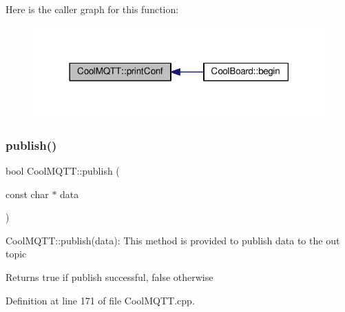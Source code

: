 Here is the caller graph for this function\+:
\nopagebreak
\begin{figure}[H]
\begin{center}
\leavevmode
\includegraphics[width=318pt]{class_cool_m_q_t_t_a40553a0ad4b5ecf1cb4411ab54ca85fb_icgraph}
\end{center}
\end{figure}
\mbox{\label{class_cool_m_q_t_t_ace977b3e90ab14b1199fe5c4fb0a13ec}} 
\subsubsection{\texorpdfstring{publish()}{publish()}\hspace{0.1cm}{\footnotesize\ttfamily [1/2]}}
{\footnotesize\ttfamily bool Cool\+M\+Q\+T\+T\+::publish (\begin{DoxyParamCaption}\item[{const char $\ast$}]{data }\end{DoxyParamCaption})}

Cool\+M\+Q\+T\+T\+::publish(data)\+: This method is provided to publish data to the out topic

\begin{DoxyReturn}{Returns}
true if publish successful, false otherwise 
\end{DoxyReturn}


Definition at line 171 of file Cool\+M\+Q\+T\+T.\+cpp.

